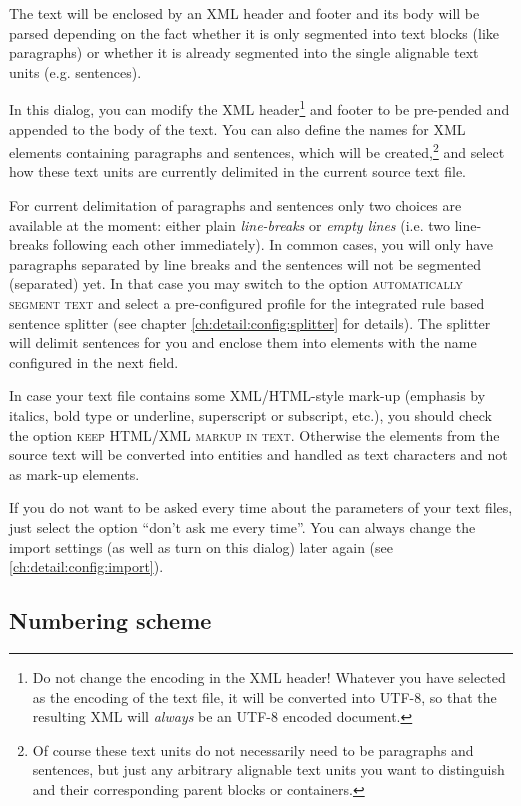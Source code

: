 \documentclass[a4paper,10pt,oneside]{book}
\newcommand{\menu}[1]{\textsc{#1}}
\begin{document}
The text will be enclosed by an XML header and footer and its body will be parsed depending on the fact whether it is only segmented into text blocks (like paragraphs) or whether it is already segmented into the single alignable text units (e.g. sentences).

In this dialog, you can modify the XML header\footnote{Do not change the encoding in the XML header! Whatever you have selected as the encoding of the text file, it will be converted into UTF-8, so that the resulting XML will \emph{always} be an UTF-8 encoded document.} and footer to be pre-pended and appended to the body of the text. You can also define the names for XML elements containing paragraphs and sentences, which will be created,\footnote{Of course these text units do not necessarily need to be paragraphs and sentences, but just any arbitrary alignable text units you want to distinguish and their corresponding parent blocks or containers.} and select how these text units are currently delimited in the current source text file.

For current delimitation of paragraphs and sentences only two choices are available at the moment: either plain \emph{line-breaks} or \emph{empty lines} (i.e. two line-breaks following each other immediately). In common cases, you will only have paragraphs separated by line breaks and the sentences will not be segmented (separated) yet. In that case you may switch to the option \menu{automatically segment text} and select a pre-configured profile for the integrated rule based sentence splitter (see chapter \ref{ch:detail:config:splitter} for details). The splitter will delimit sentences for you and enclose them into elements with the name configured in the next field.

In case your text file contains some XML/HTML-style mark-up (emphasis by italics, bold type or underline, superscript or subscript, etc.), you should check the option \menu{keep HTML/XML markup in text}. Otherwise the elements from the source text will be converted into entities and handled as text characters and not as mark-up elements.

If you do not want to be asked every time about the parameters of your text files, just select the option ``don't ask me every time''. You can always change the import settings (as well as turn on this dialog) later again (see \ref{ch:detail:config:import}).

\subsection{Numbering scheme}\label{ch:detail:managing_local:new:numbering}
\end{document}
